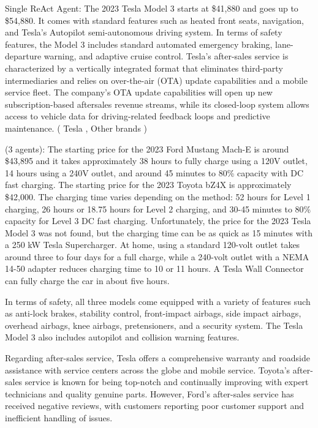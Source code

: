 {\color{blue} Single ReAct Agent}: The 2023 Tesla Model 3 starts at \$41,880 and goes up to \$54,880. It comes with standard features such as heated front seats, navigation, and Tesla's Autopilot semi-autonomous driving system. In terms of safety features, the Model 3 includes standard automated emergency braking, lane-departure warning, and adaptive cruise control. Tesla's after-sales service is characterized by a vertically integrated format that eliminates third-party intermediaries and relies on over-the-air (OTA) update capabilities and a mobile service fleet. The company's OTA update capabilities will open up new subscription-based aftersales revenue streams, while its closed-loop system allows access to vehicle data for driving-related feedback loops and predictive maintenance. ({\color{teal} Tesla \cmark}, {\color{red} Other brands \xmark})

{\color{magenta} \framework (3 agents)}: The starting price for the 2023 Ford Mustang Mach-E is around \$43,895 and it takes approximately 38 hours to fully charge using a 120V outlet, 14 hours using a 240V outlet, and around 45 minutes to 80\% capacity with DC fast charging. The starting price for the 2023 Toyota bZ4X is approximately \$42,000. The charging time varies depending on the method: 52 hours for Level 1 charging, 26 hours or 18.75 hours for Level 2 charging, and 30-45 minutes to 80\% capacity for Level 3 DC fast charging. Unfortunately, the price for the 2023 Tesla Model 3 was not found, but the charging time can be as quick as 15 minutes with a 250 kW Tesla Supercharger. At home, using a standard 120-volt outlet takes around three to four days for a full charge, while a 240-volt outlet with a NEMA 14-50 adapter reduces charging time to 10 or 11 hours. A Tesla Wall Connector can fully charge the car in about five hours.

In terms of safety, all three models come equipped with a variety of features such as anti-lock brakes, stability control, front-impact airbags, side impact airbags, overhead airbags, knee airbags, pretensioners, and a security system. The Tesla Model 3 also includes autopilot and collision warning features.

Regarding after-sales service, Tesla offers a comprehensive warranty and roadside assistance with service centers across the globe and mobile service. Toyota's after-sales service is known for being top-notch and continually improving with expert technicians and quality genuine parts. However, Ford's after-sales service has received negative reviews, with customers reporting poor customer support and inefficient handling of issues.

